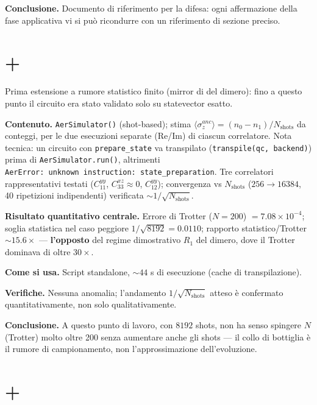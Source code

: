 \documentclass[11pt,a4paper]{article}
\begin{document}
\textbf{Conclusione.} Documento di riferimento per la difesa: ogni affermazione
della fase applicativa vi si può ricondurre con un riferimento di sezione preciso.

\section*{\texttt{} + \texttt{}}

Prima estensione a rumore statistico finito (mirror di
\texttt{} del dimero): fino a questo
punto il circuito era stato validato solo su statevector esatto.

\textbf{Contenuto.} \texttt{AerSimulator()} (shot-based); stima
$\langle\sigma_z^{anc}\rangle=(n_0-n_1)/N_\text{shots}$ da conteggi, per le due
esecuzioni separate (Re/Im) di ciascun correlatore. Nota tecnica: un circuito con
\texttt{prepare\_state} va transpilato (\texttt{transpile(qc,\ backend)}) prima di
\texttt{AerSimulator.run()}, altrimenti \texttt{AerError:\ unknown\ instruction:\
state\_preparation}. Tre correlatori rappresentativi testati
($C_{11}^{yy}$, $C_{33}^{xz}\approx0$, $C_{12}^{yy}$); convergenza vs
$N_\text{shots}$ ($256\to16384$, 40 ripetizioni indipendenti) verificata
$\sim1/\sqrt{N_\text{shots}}$.

\textbf{Risultato quantitativo centrale.} Errore di Trotter ($N=200$) $=7.08\times
10^{-4}$; soglia statistica nel caso peggiore $1/\sqrt{8192}=0.0110$; rapporto
statistico/Trotter $\sim15.6\times$ — \textbf{l'opposto} del regime dimostrativo
$R_1$ del dimero, dove il Trotter dominava di oltre $30\times$.

\textbf{Come si usa.} Script standalone, $\sim44$ s di esecuzione (cache di
transpilazione).

\textbf{Verifiche.} Nessuna anomalia; l'andamento $1/\sqrt{N_\text{shots}}$ atteso
è confermato quantitativamente, non solo qualitativamente.

\textbf{Conclusione.} A questo punto di lavoro, con $8192$ shots, non ha senso
spingere $N$ (Trotter) molto oltre 200 senza aumentare anche gli shots — il collo
di bottiglia è il rumore di campionamento, non l'approssimazione dell'evoluzione.

\section*{\texttt{} + \texttt{}}
\end{document}
